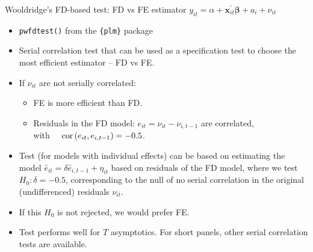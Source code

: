 \documentclass[usenames,dvipsnames]{beamer}
\begin{document}
\begin{frame}{Wooldridge's FD-based test: FD vs FE estimator}
$y_{it} = \alpha + \bm{x}^{\prime}_{it} \bm{\beta} + a_i + \nu_{it}$\\ \medskip
\begin{itemize}
    \item \texttt{pwfdtest()} from the \texttt{\{plm\}} package
    \smallskip
    \item Serial correlation test that can be used as a specification test to choose the most efficient estimator -- FD vs FE.
    \item If $\nu_{it}$ are not serially correlated: 
    \begin{itemize}
          \item FE is more efficient than FD.
          \item Residuals in the FD model: $e_{it} = \nu_{it}-\nu_{i,t-1}$ are correlated, \\with~~ $\textnormal{cor}\left(e_{it},e_{i,t-1}\right)=-0.5$.
        \end{itemize}
        \item Test (for models with individual effects) can be based on estimating the model $\hat{e}_{it}=\delta \hat{e}_{i,t-1}+\eta_{it}$ based on residuals of the FD model, where we test $H_0: \delta=-0.5$, corresponding to the null of no serial correlation in the original (undifferenced) residuals $\nu_{it}$. 
        \item If this $H_0$ is not rejected, we would prefer FE.
        \medskip
    \item Test performs well for $T$ asymptotics. For short panels, other serial correlation tests are available.
\end{itemize}
\end{frame}
\end{document}
